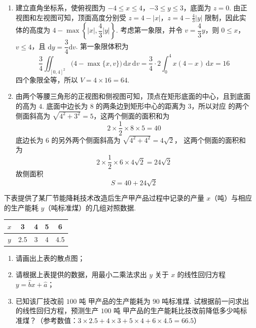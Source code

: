 \begin{solution}
\begin{enumerate}
\item 建立直角坐标系，使俯视图为
\(-4\leqslant x\leqslant4\)，\(-3\leqslant y\leqslant3\)，底面为 \(z=0\).
由正视图和左视图可知，顶面高度分别受
\(z=4-|x|\)，\(z=4-\frac{4}{3}|y|\)
限制，因此实体的高度为
\(4-\max\left\{|x|,\dfrac{4}{3}|y|\right\}\).
考虑第一象限，并令 \(v=\dfrac{4}{3}y\)，则 \(0\leqslant x\)，\(v\leqslant4\)，且
\(\mathrm{d}y=\dfrac{3}{4}\mathrm{d}v\). 第一象限体积为
\[
\frac{3}{4}\iint_{[0,4]^2}\bigl(4-\max\{x,v\}\bigr)\,\mathrm{d}x\,\mathrm{d}v
=\frac{3}{4}\cdot2\int_{0}^{4}x(4-x)\,\mathrm{d}x
=16
\]
四个象限全等，所以
\(V=4\times16=64\).
\item 由两个等腰三角形的正视图和侧视图可知，顶点在矩形底面的中心，且到底面
的高为 \(4\). 底面中边长为 \(8\) 的两条边到矩形中心的距离为 \(3\)，所以对应
的两个侧面斜高为 \(\sqrt{4^{2}+3^{2}}=5\)，这两个侧面的面积和为
\[
2\times\frac{1}{2}\times8\times5=40
\]
底边长为 \(6\) 的另外两个侧面斜高为 \(\sqrt{4^{2}+4^{2}}=4\sqrt{2}\)，
这两个侧面的面积和为
\[
2\times\frac{1}{2}\times6\times4\sqrt{2}=24\sqrt{2}
\]
故侧面积
\[
S=40+24\sqrt{2}
\]
\end{enumerate}
\end{solution}

\begin{problem}
下表提供了某厂节能降耗技术改造后生产甲产品过程中记录的产量 \(x\)（\(\text{吨}\)）与相应的生产能耗 \(y\)（\(\text{吨标准煤}\)）的几组对照数据.

\begin{center}
\begin{tabular}{c|cccc}
\(x\) & 3 & 4 & 5 & 6 \\
\hline
\(y\) & 2.5 & 3 & 4 & 4.5
\end{tabular}
\end{center}

\begin{enumerate}
\item 请画出上表的散点图；
\item 请根据上表提供的数据，用最小二乘法求出 \(y\) 关于 \(x\) 的线性回归方程 \(y = \hat{b}x + \hat{a}\)；
\item 已知该厂技改前 \(100\text{ 吨}\) 甲产品的生产能耗为 \(90\text{ 吨标准煤}\). 试根据前一问求出的线性回归方程，预测生产 \(100\text{ 吨}\) 甲产品的生产能耗比技改前降低多少吨标准煤？（参考数值：\(3 \times 2.5 + 4 \times 3 + 5 \times 4 + 6 \times 4.5 = 66.5\)）
\end{enumerate}
\end{problem}

